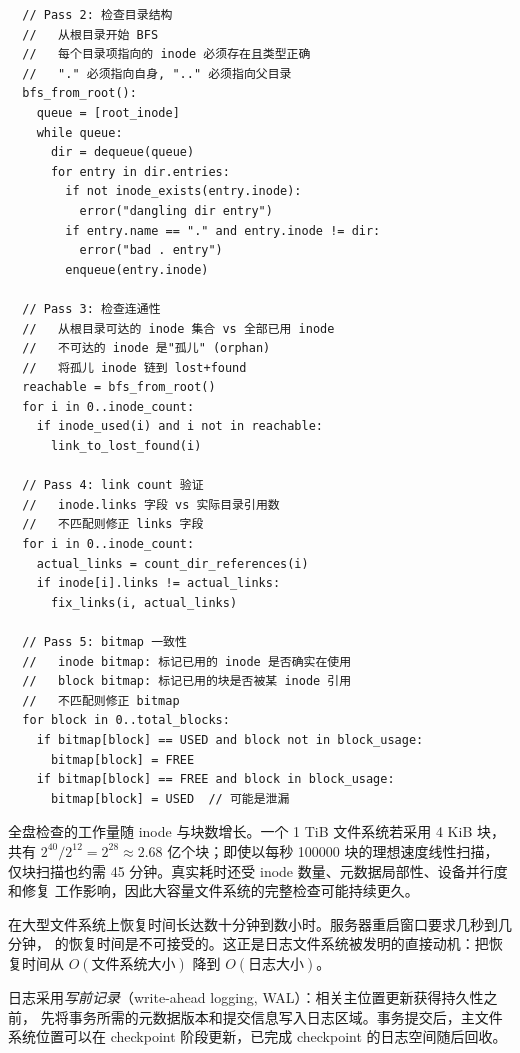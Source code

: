 \begin{filesystemlayout}
\begin{lstlisting}
  // Pass 2: 检查目录结构
  //   从根目录开始 BFS
  //   每个目录项指向的 inode 必须存在且类型正确
  //   "." 必须指向自身, ".." 必须指向父目录
  bfs_from_root():
    queue = [root_inode]
    while queue:
      dir = dequeue(queue)
      for entry in dir.entries:
        if not inode_exists(entry.inode):
          error("dangling dir entry")
        if entry.name == "." and entry.inode != dir:
          error("bad . entry")
        enqueue(entry.inode)

  // Pass 3: 检查连通性
  //   从根目录可达的 inode 集合 vs 全部已用 inode
  //   不可达的 inode 是"孤儿" (orphan)
  //   将孤儿 inode 链到 lost+found
  reachable = bfs_from_root()
  for i in 0..inode_count:
    if inode_used(i) and i not in reachable:
      link_to_lost_found(i)

  // Pass 4: link count 验证
  //   inode.links 字段 vs 实际目录引用数
  //   不匹配则修正 links 字段
  for i in 0..inode_count:
    actual_links = count_dir_references(i)
    if inode[i].links != actual_links:
      fix_links(i, actual_links)

  // Pass 5: bitmap 一致性
  //   inode bitmap: 标记已用的 inode 是否确实在使用
  //   block bitmap: 标记已用的块是否被某 inode 引用
  //   不匹配则修正 bitmap
  for block in 0..total_blocks:
    if bitmap[block] == USED and block not in block_usage:
      bitmap[block] = FREE
    if bitmap[block] == FREE and block in block_usage:
      bitmap[block] = USED  // 可能是泄漏
\end{lstlisting}

全盘检查的工作量随 inode 与块数增长。一个 1 TiB 文件系统若采用 4 KiB 块，共有
$2^{40}/2^{12}=2^{28}\approx2.68$ 亿个块；即使以每秒 100000 块的理想速度线性扫描，
仅块扫描也约需 45 分钟。真实耗时还受 inode 数量、元数据局部性、设备并行度和修复
工作影响，因此大容量文件系统的完整检查可能持续更久。

\begin{warningbox}
 在大型文件系统上恢复时间长达数十分钟到数小时。服务器重启窗口要求几秒到几分钟， 的恢复时间是不可接受的。这正是日志文件系统被发明的直接动机：把恢复时间从 $O(\text{文件系统大小})$ 降到 $O(\text{日志大小})$。
\end{warningbox}


日志采用\emph{写前记录}（write-ahead logging, WAL）：相关主位置更新获得持久性之前，
先将事务所需的元数据版本和提交信息写入日志区域。事务提交后，主文件系统位置可以在
checkpoint 阶段更新，已完成 checkpoint 的日志空间随后回收。


\end{filesystemlayout}
